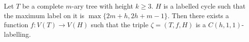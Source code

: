 

\begin{lemma}
Let $T$ be a complete $m$-ary tree with height $k \ge 3$. $H$ is a labelled cycle such that the maximum label on it is $\max\{2m+h, 2h+m-1\}$. Then there exists a function $f : V(T) \rightarrow V(H)$ such that the triple $\zeta = (T, f, H)$ is a $C(h,1,1)$-labelling. 
\end{lemma}

